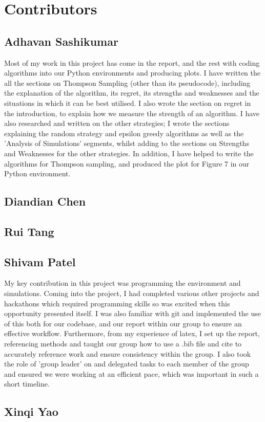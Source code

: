 \section{Contributors}\label{sec:contributors}

\subsection{Adhavan Sashikumar}\label{subsec:adhavan-sashikumar}
Most of my work in this project has come in the report, and the rest with coding algorithms into our Python environments and producing plots. I have written the all the sections on Thompson Sampling (other than its pseudocode), including the explanation of the algorithm, its regret, its strengths and weaknesses and the situations in which it can be best utilised. I also wrote the section on regret in the introduction, to explain how we measure the strength of an algorithm. I have also researched and written on the other strategies; I wrote the sections explaining the random strategy and epsilon greedy algorithms as well as the 'Analysis of Simulations' segments, whilst adding to the sections on Strengths and Weaknesses for the other strategies. In addition, I have helped to write the algorithms for Thompson sampling, and produced the plot for Figure 7 in our Python environment. 

\subsection{Diandian Chen}\label{subsec:diandian-chen}

\subsection{Rui Tang}\label{subsec:rui-tang}

\subsection{Shivam Patel}\label{subsec:shivam-patel}
My key contribution in this project was programming the environment and simulations.
Coming into the project, I had completed various other projects and hackathons which required programming skills so was excited when this opportunity presented itself.
I was also familiar with git and implemented the use of this both for our codebase, and our report within our group to ensure an effective workflow.
Furthermore, from my experience of latex, I set up the report, referencing methods and taught our group how to use a .bib file and cite to accurately reference work and ensure consistency within the group.
I also took the role of 'group leader' on and delegated tasks to each member of the group and ensured we were working at an efficient pace, which was important in such a short timeline.

\subsection{Xinqi Yao}\label{subsec:xinqi-yao}
